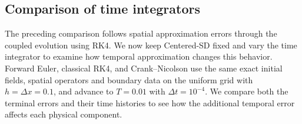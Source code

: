 \documentclass{article}
\theoremstyle{plain}
\theoremstyle{definition}
\begin{document}
\endgroup
\FloatBarrier
\subsection{Comparison of time integrators}

The preceding comparison follows spatial approximation errors through the coupled evolution using RK4. We now keep Centered-SD fixed and vary the time integrator to examine how temporal approximation changes this behavior. Forward Euler, classical RK4, and Crank–Nicolson use the same exact initial fields, spatial operators and boundary data on the uniform grid with \(h=\Delta x=0.1\), and advance to \(T=0.01\) with \(\Delta t=10^{-4}\). We compare both the terminal errors and their time histories to see how the additional temporal error affects each physical component.
\end{document}
